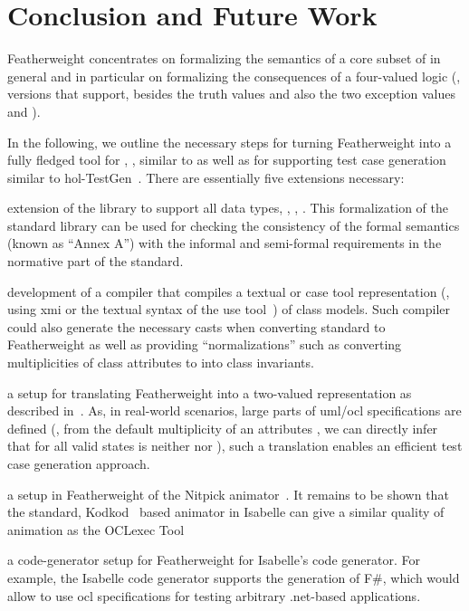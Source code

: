 \section{Conclusion and Future Work}
Featherweight \OCL concentrates on formalizing the semantics of a core
subset of \OCL in general and in particular on formalizing the
consequences of a four-valued logic (\ie, \OCL versions that support,
besides the truth values  and  also
the two exception values  and ).

In the following, we outline the necessary steps for turning
Featherweight \OCL into a fully fledged tool for \OCL, \eg, similar to
\holocl as well as for supporting test case generation similar to
\acs{hol}-TestGen~\cite{brucker.ea:hol-testgen:2009}.  There are
essentially five extensions necessary:
\begin{compactitem}
\item extension of  the library to support all \OCL data types, \eg,
  , . %
  This formalization of the \OCL standard library can be used for
  checking the consistency of the formal semantics (known as ``Annex
  A'') with the informal and semi-formal requirements in the normative
  part of the \OCL standard.
\item development of a compiler that compiles a textual or \acs{case}
  tool representation (\eg, using \acs{xmi} or the textual syntax of
  the \acs{use} tool~\cite{richters:precise:2002}) of class
  models. Such compiler could also generate the necessary casts when
  converting standard \OCL to Featherweight \OCL as well as providing
  ``normalizations'' such as converting multiplicities of class
  attributes to into \OCL class invariants.
\item a setup for translating Featherweight \OCL into a two-valued
  representation as described
  in~\cite{brucker.ea:ocl-testing:2010}. As, in real-world scenarios,
  large parts of \acs{uml}/\acs{ocl} specifications are defined (\eg,
  from the default multiplicity  of an attributes
  , we can directly infer that for all valid states
   is neither  nor ),
  such a translation enables an efficient test case generation
  approach.
\item a setup in Featherweight \OCL of the Nitpick
  animator~\cite{blanchette.ea:nitpick:2010}. It remains to be shown
  that the standard, Kodkod~\cite{torlak.ea:kodkod:2007} based
  animator in Isabelle can give a similar quality of animation as the
  OCLexec Tool~\cite{krieger.ea:generative:2010}
\item a code-generator setup for Featherweight \OCL for Isabelle's
  code generator. For example, the Isabelle code generator supports
  the generation of F\#, which would allow to use \acs{ocl}
  specifications for testing arbitrary .net-based applications.
\end{compactitem}
